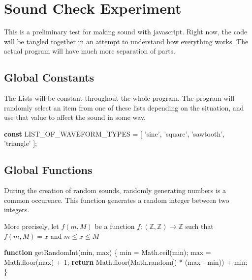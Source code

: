 \documentclass[]{article}
\date{}
\newenvironment{Shaded}{}{}
\newcommand{\KeywordTok}[1]{\textbf{#1}}
\newcommand{\DecValTok}[1]{#1}
\newcommand{\StringTok}[1]{#1}
\newcommand{\VariableTok}[1]{#1}
\newcommand{\ControlFlowTok}[1]{\textbf{#1}}
\newcommand{\OperatorTok}[1]{#1}
\newcommand{\AttributeTok}[1]{#1}
\newcommand{\NormalTok}[1]{#1}
\begin{document}
\section{Sound Check Experiment}\label{sound-check-experiment}

This is a preliminary test for making sound with javascript. Right now,
the code will be tangled together in an attempt to understand how
everything works. The actual program will have much more separation of
parts.

\subsection{Global Constants}\label{global-constants}

The Lists will be constant throughout the whole program. The program
will randomly select an item from one of these lists depending on the
situation, and use that value to affect the sound in some way.

\begin{Shaded}
\begin{Highlighting}[]
\KeywordTok{const}\NormalTok{ LIST_OF_WAVEFORM_TYPES }\OperatorTok{=}\NormalTok{ [}
    \StringTok{'sine'}\OperatorTok{,} \StringTok{'square'}\OperatorTok{,} \StringTok{'sawtooth'}\OperatorTok{,} \StringTok{'triangle'}
\NormalTok{]}\OperatorTok{;}
\end{Highlighting}
\end{Shaded}

\subsection{Global Functions}\label{global-functions}

During the creation of random sounds, randomly generating numbers is a
common occurence. This function generates a random integer between two
integers.

More precisely, let \(f(m,M)\) be a function
\(f:(\mathbb{Z}, \mathbb{Z}) \to \mathbb{Z}\) such that \(f(m,M) = x\)
and \(m \leq x \leq M\)

\begin{Shaded}
\begin{Highlighting}[]
\KeywordTok{function} \AttributeTok{getRandomInt}\NormalTok{(min}\OperatorTok{,}\NormalTok{ max) }\OperatorTok{\{}
\NormalTok{    min }\OperatorTok{=} \VariableTok{Math}\NormalTok{.}\AttributeTok{ceil}\NormalTok{(min)}\OperatorTok{;}
\NormalTok{    max }\OperatorTok{=} \VariableTok{Math}\NormalTok{.}\AttributeTok{floor}\NormalTok{(max) }\OperatorTok{+} \DecValTok{1}\OperatorTok{;}
    \ControlFlowTok{return} \VariableTok{Math}\NormalTok{.}\AttributeTok{floor}\NormalTok{(}\VariableTok{Math}\NormalTok{.}\AttributeTok{random}\NormalTok{() }\OperatorTok{*}\NormalTok{ (max }\OperatorTok{-}\NormalTok{ min)) }\OperatorTok{+}\NormalTok{ min}\OperatorTok{;}
\OperatorTok{\}}
\end{Highlighting}
\end{Shaded}
\end{document}
